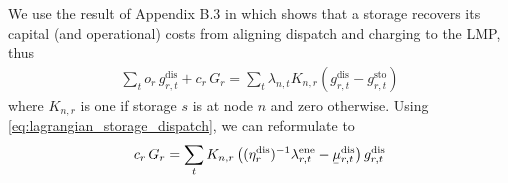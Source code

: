 \documentclass[11pt,twocolumn]{article}
\newcommand{\ubar}[1]{\underaccent{\bar}{#1}}
\newcommand{\storage}{g_{r,t}}
\newcommand{\storagedispatch}{\storage^\text{dis}}
\newcommand{\storagecharge}{\storage^\text{sto}}
\newcommand{\storagesoc}{\storage^\text{ene}}
\newcommand{\efficiency}{\eta_{r}}
\newcommand{\efficiencydispatch}{\efficiency^\text{dis}}
\newcommand{\operationalpricestorage}{o_r}
\newcommand{\capitalpricestorage}{c_r}
\newcommand{\capacitystorage}{G_r}
\newcommand{\mulowerstoragedispatch}{\ubar{\mu}_{r,t}^\text{dis}}
\newcommand{\muupperstoragedispatch}{\bar{\mu}_{r,t}^\text{dis}}
\newcommand{\muupperstoragecharge}{\bar{\mu}_{r,t}^\text{sto}}
\newcommand{\muupperstoragesoc}{\bar{\mu}_{r,t}^\text{ene}}
\newcommand{\mustateofcharge}{\lambda^\text{ene}_{r,t}}
\newcommand{\lmp}[1][n]{\lambda_{#1,t}}
\newcommand{\incidencestorage}[1][n]{K_{#1,r}}
\newcommand{\capexstorage}{\mathcal{C}^E}
\begin{document}

We use the result of Appendix B.3 in \cite{brown_decreasing_2020} which shows that a storage recovers its capital (and operational) costs from aligning dispatch and charging to the LMP, thus 
\begin{align}
    \sum_t \operationalpricestorage \, \storagedispatch + \capitalpricestorage \, \capacitystorage = \sum_t \lmp \incidencestorage \left(\storagedispatch - \storagecharge \right) 
\end{align}
where $\incidencestorage$ is one if storage $s$ is at node $n$ and zero otherwise. Using \cref{eq:lagrangian_storage_dispatch}, we can reformulate to 
\begin{align}
    \capitalpricestorage \, \capacitystorage = \sum_t \incidencestorage \left( (\efficiencydispatch )^{-1} \mustateofcharge - \mulowerstoragedispatch \right) \storagedispatch 
\end{align}



\end{document}
